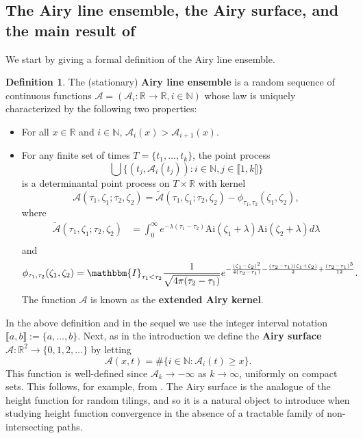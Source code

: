 \documentclass[11pt,twoside]{amsart}
\theoremstyle{plain}
\numberwithin{quest}{section}
\theoremstyle{remark}
\numberwithin{rem}{section}
\theoremstyle{definition}
\newtheorem{defn}[rem]{Definition}
\newcommand{\N}{\mathbb{N}}
\newcommand{\R}{\mathbb{R}}
\newcommand{\cA}{\mathcal{A}}
\newcommand{\II}[1]{\llbracket #1 \rrbracket}
\begin{document}
	\subsection{The Airy line ensemble, the Airy surface, and the main result of \cite{BCJ18}}
	\qquad
	
	We start by giving a formal definition of the Airy line ensemble.
	\begin{defn}
		\label{D:ALE-formal}
		The (stationary) \textbf{Airy line ensemble} is a random sequence of continuous functions $\cA = (\cA_i:\R \to \R, i \in \N)$ whose law is uniquely characterized by the following two properties:
		\begin{itemize}
			\item For all $x \in \R$ and $i \in \N$, $\cA_i(x) > \cA_{i+1}(x)$.
			\item For any finite set of times $T = \{t_1, \dots, t_k\}$, the point process 
			$$
			\bigcup \{(t_j, \cA_i(t_j)) : i \in \N, j \in \II{1, k}\}
			$$
			is a determinantal point process on $T \times \R$ with kernel
			\begin{equation}\label{eq:extendedAiry}
				{\mathcal{A}}(\tau_1,\zeta_1;\tau_2,\zeta_2)=\tilde{\mathcal{A}}(\tau_1,\zeta_1;\tau_2,\zeta_2)-\phi_{\tau_1,\tau_2} (\zeta_1 ,\zeta_2),
			\end{equation}
			where
			\begin{equation} \label{eq:Airymod}
				\begin{split}
					\tilde{\mathcal{A}}(\tau_1,\zeta_1;\tau_2,\zeta_2)&= 
					\int_0^\infty e^{-\lambda (\tau_1-\tau_2) } \mathrm{Ai} (\zeta_1 +\lambda) \mathrm{Ai} (\zeta_2+\lambda) d\lambda\\
				\end{split}
			\end{equation}
			and
			\begin{equation}\label{eq:Airyphi}
				\phi_{\tau_1,\tau_2} (\zeta_1 ,\zeta_2) =
				\mathbbm{I}_{\tau_1<\tau_2} \frac{1}{\sqrt{4 \pi (\tau_2-\tau_1)}} e^{-\frac{(\zeta_1-\zeta_2)^2}{4(\tau_2-\tau_1)}-\frac{(\tau_2-\tau_1)(\zeta_1+\zeta_2)}{2}+\frac{(\tau_2-\tau_1)^3}{12}}.
			\end{equation}
			The function $\cA$ is known as the \textbf{extended Airy kernel}.
		\end{itemize}
	\end{defn}
    In the above definition and in the sequel we use the integer interval notation $\II{a, b} := \{a, \dots, b\}$.
	Next, as in the introduction we define the \textbf{Airy surface} $\cA:\R^2 \to \{0, 1, 2, \dots\}$ by letting 
	$$
	\cA(x, t) = \# \{i \in \N : \cA_i(t) \ge x\}.
	$$
	This function is well-defined since $\cA_k \to -\infty$ as $k \to \infty$, uniformly on compact sets. This follows, for example, from \cite[Theorem 1.6]{DauvergneVirag2021}. The Airy surface is the analogue of the height function for random tilings, and so it is a natural object to introduce when studying height function convergence in the absence of a tractable family of non-intersecting paths. 
	
\end{document}
